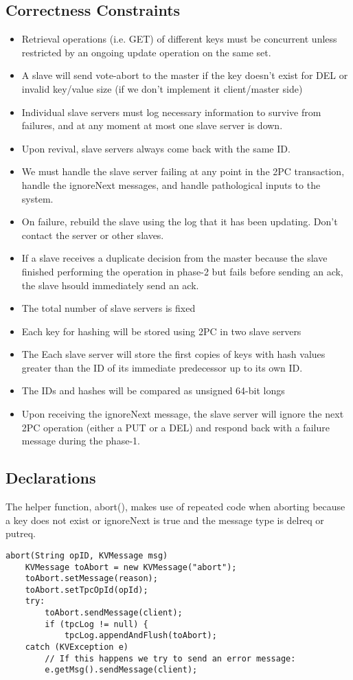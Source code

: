 \documentclass{article}
\begin{document}
\subsection*{Correctness Constraints}
\begin{itemize}
\item Retrieval operations (i.e. GET) of different keys must be concurrent unless restricted by an ongoing update operation on the same set.
\item A slave will send vote-abort to the master if the key doesn't exist for DEL or invalid key/value size (if we don't implement it client/master side)
\item  Individual slave servers must log necessary information to survive from failures, and at any moment at most one slave server is down.
\item Upon revival, slave servers always come back with the same ID.
\item We must handle the slave server failing at any point in the 2PC transaction, handle the ignoreNext messages, and handle pathological inputs to the system.
\item On failure, rebuild the slave using the log that it has been updating. Don't contact the server or other slaves.
\item If a slave receives a duplicate decision from the master because the slave finished performing the operation in phase-2 but fails before sending an ack, the slave hsould immediately send an ack.
\item The total number of slave servers is fixed
\item Each key for hashing will be stored using 2PC in two slave servers
\item The Each slave server will store the first copies of keys with hash values greater than the ID of its immediate predecessor up to its own ID.
\item The IDs and hashes will be compared as unsigned 64-bit longs
\item Upon receiving the ignoreNext message, the slave server will ignore the next 2PC operation (either a PUT or a DEL) and respond back with a failure message during the phase-1.
\end{itemize}

\subsection*{Declarations}
The helper function, abort(), makes use of repeated code when aborting because a key does not exist or ignoreNext is true and the message type is delreq or putreq.
\begin{verbatim}
abort(String opID, KVMessage msg)
    KVMessage toAbort = new KVMessage("abort");
    toAbort.setMessage(reason);
    toAbort.setTpcOpId(opId);
    try:
        toAbort.sendMessage(client);
        if (tpcLog != null) {
            tpcLog.appendAndFlush(toAbort);
    catch (KVException e)
        // If this happens we try to send an error message:
        e.getMsg().sendMessage(client);
\end{verbatim}
\end{document}
